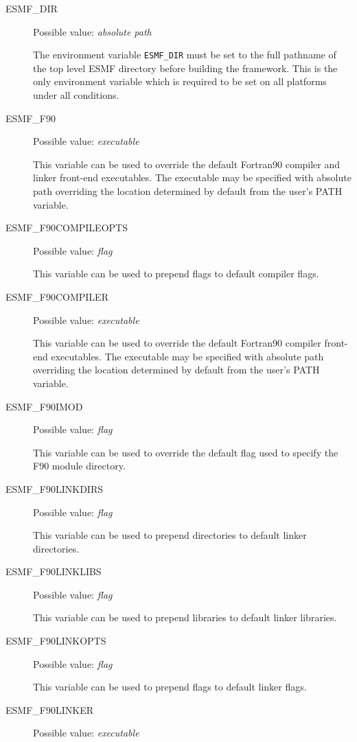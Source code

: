 \begin{description}
\item[ESMF\_DIR]
Possible value: {\em absolute path}

The environment variable {\tt ESMF\_DIR} must be set to the full pathname 
of the top level ESMF directory before building the framework. This is the 
only environment variable which is required to be set on all platforms under 
all conditions.

\item[ESMF\_F90]
Possible value: {\em executable}

This variable can be used to override the default Fortran90 compiler and linker
front-end executables. The executable may be specified with absolute path
overriding the location determined by default from the user's PATH variable.

\item[ESMF\_F90COMPILEOPTS]
Possible value: {\em flag}

This variable can be used to prepend flags to default compiler flags.

\item[ESMF\_F90COMPILER]
Possible value: {\em executable}

This variable can be used to override the default Fortran90 compiler
front-end executables. The executable may be specified with absolute path
overriding the location determined by default from the user's PATH variable.

\item[ESMF\_F90IMOD]
Possible value: {\em flag}

This variable can be used to override the default flag used to specify the F90
module directory.

\item[ESMF\_F90LINKDIRS]
Possible value: {\em flag}

This variable can be used to prepend directories to default linker directories.

\item[ESMF\_F90LINKLIBS]
Possible value: {\em flag}

This variable can be used to prepend libraries to default linker libraries.

\item[ESMF\_F90LINKOPTS]
Possible value: {\em flag}

This variable can be used to prepend flags to default linker flags.

\item[ESMF\_F90LINKER]
Possible value: {\em executable}


\end{description}
